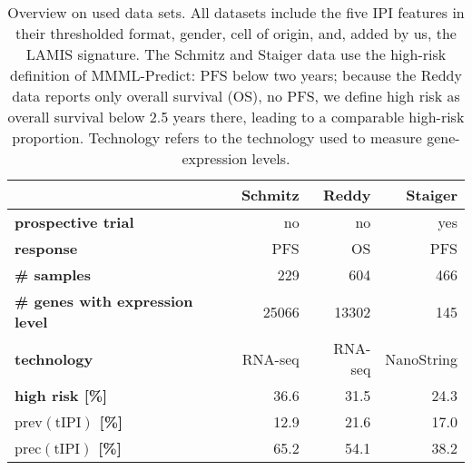 \begin{table}
    \centering
    \begin{tabular}{lrrr}
        \hline
        & \textbf{Schmitz} & \textbf{Reddy} & \textbf{Staiger} \\
        \hline
        \textbf{prospective trial} & no & no & yes \\
        \textbf{response} & PFS & OS & PFS \\
        \textbf{\# samples} & \num{229} & \num{604} & \num{466} \\
        \textbf{\# genes with expression level} & \num{25066} & \num{13302} & \num{145} \\
        \textbf{technology} & RNA-seq & RNA-seq & NanoString \\
        \textbf{high risk [\%]} & \num{36.6} & \num{31.5} & \num{24.3} \\
        \textbf{$\text{prev}(\text{tIPI})$ [\%]} & \num{12.9} & \num{21.6} & \num{17.0} \\
        \textbf{$\text{prec}(\text{tIPI})$ [\%]} & \num{65.2} & \num{54.1} & \num{38.2} \\
        \hline
    \end{tabular}
    \caption{Overview on used data sets. All datasets include the five IPI features in their 
        thresholded format, gender, cell of origin, and, added by us, the LAMIS signature. The 
        Schmitz and Staiger data use the high-risk definition of MMML-Predict: PFS below two years; 
        because the Reddy data reports only overall survival (OS), no PFS, we define high 
        risk as overall survival below \num{2.5} years there, leading to a comparable high-risk 
        proportion. Technology refers to the technology used to measure gene-expression levels.}
        \label{table:data}
\end{table}